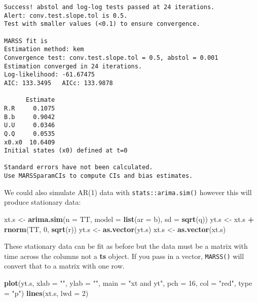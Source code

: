 \documentclass[12pt,]{book}
\newenvironment{Shaded}{\begin{snugshade}}{\end{snugshade}}
\newcommand{\DataTypeTok}[1]{\textcolor[rgb]{0.13,0.29,0.53}{#1}}
\newcommand{\DecValTok}[1]{\textcolor[rgb]{0.00,0.00,0.81}{#1}}
\newcommand{\KeywordTok}[1]{\textcolor[rgb]{0.13,0.29,0.53}{\textbf{#1}}}
\newcommand{\NormalTok}[1]{#1}
\newcommand{\OperatorTok}[1]{\textcolor[rgb]{0.81,0.36,0.00}{\textbf{#1}}}
\newcommand{\StringTok}[1]{\textcolor[rgb]{0.31,0.60,0.02}{#1}}
\begin{document}
\begin{verbatim}
Success! abstol and log-log tests passed at 24 iterations.
Alert: conv.test.slope.tol is 0.5.
Test with smaller values (<0.1) to ensure convergence.

MARSS fit is
Estimation method: kem 
Convergence test: conv.test.slope.tol = 0.5, abstol = 0.001
Estimation converged in 24 iterations. 
Log-likelihood: -61.67475 
AIC: 133.3495   AICc: 133.9878   
 
      Estimate
R.R     0.1075
B.b     0.9042
U.U     0.0346
Q.Q     0.0535
x0.x0  10.6409
Initial states (x0) defined at t=0

Standard errors have not been calculated. 
Use MARSSparamCIs to compute CIs and bias estimates.
\end{verbatim}

We could also simulate AR(1) data with \texttt{stats::arima.sim()} however this will produce stationary data:

\begin{Shaded}
\begin{Highlighting}[]
\NormalTok{xt.s <-}\StringTok{ }\KeywordTok{arima.sim}\NormalTok{(}\DataTypeTok{n =}\NormalTok{ TT, }\DataTypeTok{model =} \KeywordTok{list}\NormalTok{(}\DataTypeTok{ar =}\NormalTok{ b), }\DataTypeTok{sd =} \KeywordTok{sqrt}\NormalTok{(q))}
\NormalTok{yt.s <-}\StringTok{ }\NormalTok{xt.s }\OperatorTok{+}\StringTok{ }\KeywordTok{rnorm}\NormalTok{(TT, }\DecValTok{0}\NormalTok{, }\KeywordTok{sqrt}\NormalTok{(r))}
\NormalTok{yt.s <-}\StringTok{ }\KeywordTok{as.vector}\NormalTok{(yt.s)}
\NormalTok{xt.s <-}\StringTok{ }\KeywordTok{as.vector}\NormalTok{(xt.s)}
\end{Highlighting}
\end{Shaded}

These stationary data can be fit as before but the data must be a matrix with time across the columns not a \textbf{ts} object. If you pass in a vector, \texttt{MARSS()} will convert that to a matrix with one row.

\begin{Shaded}
\begin{Highlighting}[]
\KeywordTok{plot}\NormalTok{(yt.s, }\DataTypeTok{xlab =} \StringTok{""}\NormalTok{, }\DataTypeTok{ylab =} \StringTok{""}\NormalTok{, }\DataTypeTok{main =} \StringTok{"xt and yt"}\NormalTok{, }\DataTypeTok{pch =} \DecValTok{16}\NormalTok{, }
    \DataTypeTok{col =} \StringTok{"red"}\NormalTok{, }\DataTypeTok{type =} \StringTok{"p"}\NormalTok{)}
\KeywordTok{lines}\NormalTok{(xt.s, }\DataTypeTok{lwd =} \DecValTok{2}\NormalTok{)}
\end{Highlighting}
\end{Shaded}
\end{document}
